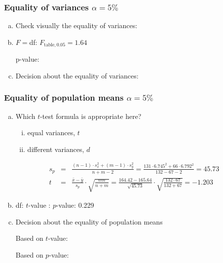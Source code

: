 \subsubsection*{Equality of variances $\alpha=5\%$}
		\begin{enumerate}[a)]
		\item Check visually the equality of variances:	\hrulefill

			
		\item $F =$\hrulefill \quad df: \hrulefill \quad $F_{\textrm{table}, 0.05} = 1.64$ 
			
					p-value: \hrulefill
		\item Decision about the equality of variances: \hrulefill
		\end{enumerate}
		
\subsubsection*{Equality of population means $\alpha=5\%$}
		\begin{enumerate}[a)]

		\item Which $t$-test formula is appropriate here?
			\begin{enumerate}[i)]
				\item equal variances, $t$
				\item different variances, $d$
			\end{enumerate}
			
			\begin{eqnarray*}
			s_p &=& \frac{(n-1) \cdot s_x^2 + (m-1) \cdot s_y^2} { n+m-2 } = \frac{131 \cdot 6.745^2+66 \cdot 6.792^2} { 132-67-2 } = 45.73\\
			t   &=& \frac{ \bar x- \bar y }{ s_p } \cdot \sqrt { \frac{nm}{n+m} } = 
					\frac{ 164.42-165.64 }{\sqrt{45.73}} \cdot \sqrt { \frac{132 \cdot 67}{132+67 }}=-1.203
			\end{eqnarray*}
		
				\item df: \hrulefill\quad		$t$-value :	\hrulefill \quad $p$-value: 0.229 %
		\item Decision about the equality of population means 	\hrulefill
		
			Based on $t$-value: \hrulefill
			
			Based on $p$-value:  \hrulefill
		
		\end{enumerate}

